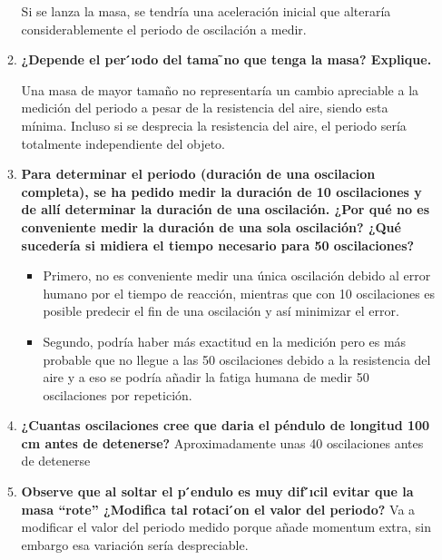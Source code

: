 \documentclass[10pt]{article}
\begin{document}
\begin{enumerate}
\begin{enumerate}
    Si se lanza la masa, se tendría una aceleración inicial que alteraría considerablemente el periodo de oscilación a medir.
    \item \textbf{¿Depende el per ́ıodo del tama ̃no que tenga la masa? Explique.}

    
Una masa de mayor tamaño no representaría un cambio apreciable a la medición del periodo a pesar de la resistencia del aire, siendo esta mínima. Incluso si se desprecia la resistencia del aire, el periodo sería totalmente independiente del objeto.
    \item \textbf{Para determinar el periodo (duración de una oscilacion completa), se ha pedido medir la duración de 10 oscilaciones y de allí determinar la duración de una oscilación. ¿Por qué no es conveniente medir la duración de una sola oscilación? ¿Qué sucedería si midiera el tiempo necesario para 50 oscilaciones?}
    \begin{itemize}
        \item Primero, no es conveniente medir una única oscilación debido al error humano por el tiempo de reacción, mientras que con 10 oscilaciones es posible predecir el fin de una oscilación y así minimizar el error.
        \item Segundo, podría haber más exactitud en la medición pero es más probable que no llegue a las 50 oscilaciones debido a la resistencia del aire y a eso se podría añadir la fatiga humana de medir 50 oscilaciones por repetición. 
    \end{itemize}

    \item \textbf{¿Cuantas oscilaciones cree que daria el péndulo de longitud 100 cm antes de detenerse?}
Aproximadamente unas 40 oscilaciones antes de detenerse  
    \item \textbf{Observe que al soltar el p ́endulo es muy dif ́ıcil evitar que la masa “rote” ¿Modifica tal rotaci ́on el valor del periodo?}
Va a modificar el valor del periodo medido porque añade momentum extra, sin embargo esa variación sería despreciable. 

\end{enumerate}

\end{enumerate}
\end{document}
